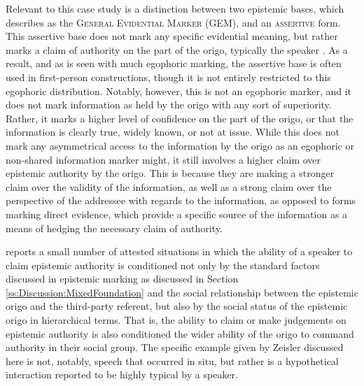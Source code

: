 Relevant to this case study is a distinction between two epistemic bases, which  describes as the \textsc{General Evidential Marker} (GEM), and an \textsc{assertive} form. This assertive base does not mark any specific evidential meaning, but rather marks a claim of authority on the part of the origo, typically the speaker \cite{Zeisler2018a}. As a result, and as is seen with much egophoric marking, the assertive base is often used in first-person constructions, though it is not entirely restricted to this egophoric distribution. Notably, however, this is not an egophoric marker, and it does not mark information as held by the origo with any sort of superiority. Rather, it marks a higher level of confidence on the part of the origo, or that the information is clearly true, widely known, or not at issue. While this does not mark any asymmetrical access to the information by the origo as an egophoric or non-shared information marker might, it still involves a higher claim over epistemic authority by the origo. This is because they are making a stronger claim over the validity of the information, as well as a strong claim over the perspective of the addressee with regards to the information, as opposed to forms marking direct evidence, which provide a specific source of the information as a means of hedging the necessary claim of authority.

 reports a small number of attested situations in which the ability of a speaker to claim epistemic authority is conditioned not only by the standard factors discussed in epistemic marking as discussed in Section \ref{ss:Discussion:MixedFoundation} and the social relationship between the epistemic origo and the third-party referent, but also by the social status of the epistemic origo in hierarchical terms. That is, the ability to claim or make judgements on epistemic authority is also conditioned the wider ability of the origo to command authority in their social group. The specific example given by Zeisler discussed here is not, notably, speech that occurred in situ, but rather is a hypothetical interaction reported to be highly typical by a speaker.

